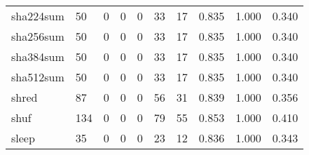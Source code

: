 \begin{longtable}{lp{1.3cm}p{1.3cm}p{1.3cm}p{1.3cm}p{1.3cm}p{1.3cm}p{1.3cm}p{1.3cm}p{1.3cm}}
sha224sum &                     50 &                                             0 &                                            0 &                                           0 &                                           33 &                                         17 &                                0.835 &                                  1.000 &                                0.340 \\
sha256sum &                     50 &                                             0 &                                            0 &                                           0 &                                           33 &                                         17 &                                0.835 &                                  1.000 &                                0.340 \\
sha384sum &                     50 &                                             0 &                                            0 &                                           0 &                                           33 &                                         17 &                                0.835 &                                  1.000 &                                0.340 \\
sha512sum &                     50 &                                             0 &                                            0 &                                           0 &                                           33 &                                         17 &                                0.835 &                                  1.000 &                                0.340 \\
shred     &                     87 &                                             0 &                                            0 &                                           0 &                                           56 &                                         31 &                                0.839 &                                  1.000 &                                0.356 \\
shuf      &                    134 &                                             0 &                                            0 &                                           0 &                                           79 &                                         55 &                                0.853 &                                  1.000 &                                0.410 \\
sleep     &                     35 &                                             0 &                                            0 &                                           0 &                                           23 &                                         12 &                                0.836 &                                  1.000 &                                0.343 \\

\end{longtable}
